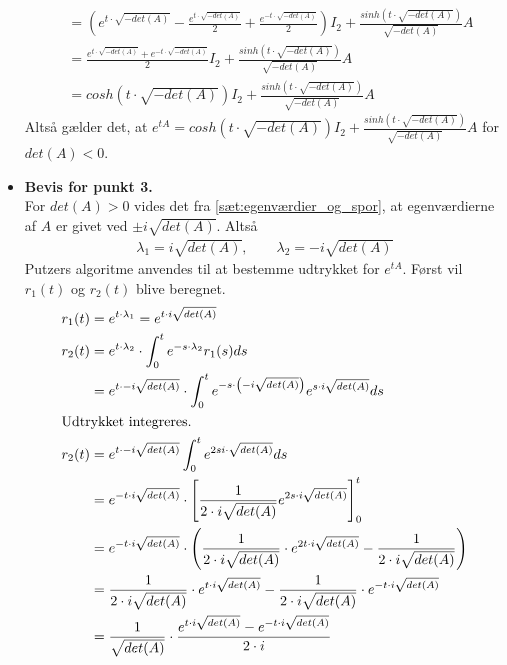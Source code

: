 \begin{bev}
\begin{itemize}
\begin{align*}
        &= \left(e^{t \cdot \sqrt{-det(A)}} - \frac{e^{t\cdot\sqrt{-det(A)}}}{2} + \frac{e^{-t\cdot\sqrt{-det(A)}}}{2} \right) I_2 + \frac{sinh\left(t\cdot \sqrt{-det(A)}\right)}{\sqrt{-det(A)}}A\\
        &= \frac{e^{t \cdot \sqrt{-det(A)}}+e^{-t \cdot \sqrt{-det(A)}}}{2}I_2+ \frac{sinh\left(t\cdot \sqrt{-det(A)}\right)}{\sqrt{-det(A)}}A\\
        &= cosh\left(t\cdot \sqrt{-det(A)}\right) I_2 + \frac{sinh\left(t\cdot \sqrt{-det(A)}\right)}{\sqrt{-det(A)}} A
    \end{align*}
    Altså gælder det, at $e^{tA} = cosh\left(t\cdot \sqrt{-det(A)}\right) I_2 + \frac{sinh\left(t\cdot \sqrt{-det(A)}\right)}{\sqrt{-det(A)}}A$ for $det(A)<0$.
    \item [] \textbf{Bevis for punkt 3.}\\    
    For $det(A)>0$ vides det fra \autoref{sæt:egenværdier_og_spor}, at egenværdierne af $A$ er givet ved $\pm i\sqrt{det(A)}$. Altså
    \begin{align*}
        \lambda_1=i\sqrt{det(A)},\qquad \lambda_2=-i\sqrt{det(A)}
    \end{align*}   
    Putzers algoritme anvendes til at bestemme udtrykket for $e^{tA}$. Først vil $r_1(t)$ og $r_2(t)$ blive beregnet.
    \begin{align*}
        r_1(t) &= e^{t\cdot \lambda_1} = e^{t \cdot i\sqrt{det(A)}} \\
        r_2(t) &= e^{t\cdot \lambda_2} \cdot \int_0^te^{-s\cdot \lambda_2}r_1(s) ds\\
        &= e^{t\cdot -i\sqrt{det(A)}} \cdot \int_0^te^{-s\cdot \left(-i\sqrt{det(A)}\right)} e^{s \cdot i\sqrt{det(A)}} ds\\
        \intertext{Udtrykket integreres.}
         r_2(t)&=e^{t\cdot -i\sqrt{det(A)}}\int_0^t e^{2si\cdot \sqrt{det(A)}}ds\\
         &=e^{-t\cdot i\sqrt{det(A)}}\cdot \left[\frac{1}{2\cdot i\sqrt{det(A)}}e^{2s\cdot i\sqrt{det(A)}}\right]^t_0\\
         &= e^{-t\cdot i\sqrt{det(A)}}\cdot \left(\frac{1}{2\cdot i\sqrt{det(A)}}\cdot e^{2t\cdot i\sqrt{det(A)}} - \frac{1}{2\cdot i\sqrt{det(A)}}\right)\\
         &= \frac{1}{2 \cdot i\sqrt{det(A)}}\cdot e^{t\cdot i\sqrt{det(A)}} - \frac{1}{2 \cdot i\sqrt{det(A)}}\cdot e^{-t\cdot i\sqrt{det(A)}}\\
         &=\frac{1}{\sqrt{det(A)}} \cdot \frac{e^{t\cdot i\sqrt{det(A)}}-e^{-t\cdot i\sqrt{det(A)}}}{2\cdot i}

\end{align*}
\end{itemize}
\end{bev}
